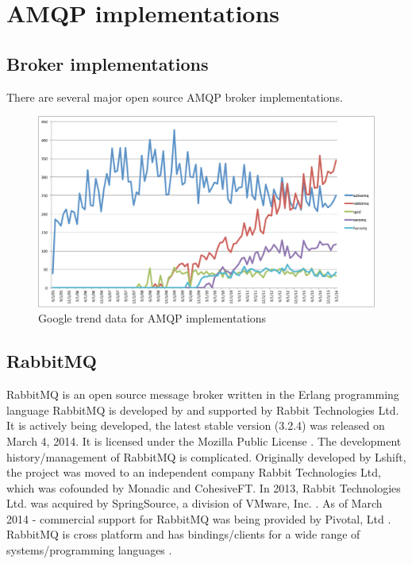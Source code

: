 \documentclass{thesis}
\begin{document}
\section{AMQP implementations}

\subsection{Broker implementations}

There are several major open source AMQP broker implementations.  

\begin{figure}[h]
\centering
\includegraphics[scale=.5]{broker_popularity}  
\caption{Google trend data for AMQP implementations}
\end{figure}


\subsection{RabbitMQ}
RabbitMQ is an open source message broker written in the Erlang programming language \cite{RABBITMQ} RabbitMQ is developed by and supported by Rabbit Technologies Ltd.  It is actively being developed, the latest stable version (3.2.4) was released on March 4, 2014.  It is licensed under the Mozilla Public License \cite{rabbitmq-wikipedia}.  The development history/management of RabbitMQ is complicated.  Originally developed by Lshift, the project was moved to an independent company Rabbit Technologies Ltd, which was cofounded by Monadic and CohesiveFT.  In 2013, Rabbit Technologies Ltd. was acquired by SpringSource, a division of VMware, Inc. \cite{LSHIFT}.  As of March 2014 - commercial support for RabbitMQ was being provided by Pivotal, Ltd \cite{PIVOTAL}.  RabbitMQ is cross platform and has bindings/clients for a wide range of systems/programming languages \cite{RABBITMQ_CLIENTS}.  
\end{document}
